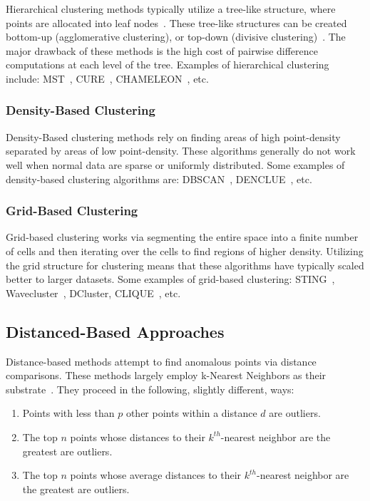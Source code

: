 Hierarchical clustering methods typically utilize a tree-like structure, where points are allocated into leaf nodes~\cite{wang_progress_2019}.
These tree-like structures can be created bottom-up (agglomerative clustering), or top-down (divisive clustering)~\cite{rakesh_agrawal_automatic_1998}.
The major drawback of these methods is the high cost of pairwise difference computations at each level of the tree.
Examples of hierarchical clustering include: 
MST~\cite{charles_zahn_graph_1971}, 
CURE~\cite{noauthor_cure:_nodate}, 
CHAMELEON~\cite{karypis_chameleon:_nodate}, 
etc.

\subsubsection{Density-Based Clustering}

Density-Based clustering methods rely on finding areas of high point-density separated by areas of low point-density.
These algorithms generally do not work well when normal data are sparse or uniformly distributed.
Some examples of density-based clustering algorithms are: 
DBSCAN~\cite{ester_density-based_nodate}, 
DENCLUE~\cite{Hinneburg1998Effic-5816}, 
etc.

\subsubsection{Grid-Based Clustering}

Grid-based clustering works via segmenting the entire space into a finite number of cells and then iterating over the cells to find regions of higher density.
Utilizing the grid structure for clustering means that these algorithms have typically scaled better to larger datasets.
Some examples of grid-based clustering: 
STING~\cite{sting:wang}, 
Wavecluster~\cite{Wavecluster:Sheikholeslami:2000}, 
DCluster,  %
CLIQUE~\cite{rakesh_agrawal_automatic_1998}, 
etc.

\subsection{Distanced-Based Approaches}

Distance-based methods attempt to find anomalous points via distance comparisons.
These methods largely employ k-Nearest Neighbors as their substrate~\cite{wang_progress_2019}.
They proceed in the following, slightly different, ways:

\begin{enumerate}
    \item Points with less than $p$ other points within a distance $d$ are outliers.
    \item The top $n$ points whose distances to their $k^{th}$-nearest neighbor are the greatest are outliers.
    \item The top $n$ points whose average distances to their $k^{th}$-nearest neighbor are the greatest are outliers.
\end{enumerate}


